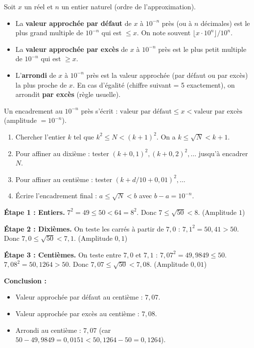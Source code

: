 \documentclass[11pt]{article}
\begin{document}
\begin{definition}
Soit $x$ un réel et $n$ un entier naturel (ordre de l'approximation).
\begin{itemize}
    \item La \textbf{valeur approchée par défaut} de $x$ à $10^{-n}$ près (ou à $n$ décimales) est le plus grand multiple de $10^{-n}$ qui est $\le x$. On note souvent $\lfloor x \cdot 10^n \rfloor / 10^n$.
    \item La \textbf{valeur approchée par excès} de $x$ à $10^{-n}$ près est le plus petit multiple de $10^{-n}$ qui est $\ge x$.
    \item L'\textbf{arrondi} de $x$ à $10^{-n}$ près est la valeur approchée (par défaut ou par excès) la plus proche de $x$. En cas d'égalité (chiffre suivant = 5 exactement), on arrondit \textbf{par excès} (règle usuelle).
\end{itemize}
Un encadrement au $10^{-n}$ près s'écrit : $\text{valeur par défaut} \le x < \text{valeur par excès}$ (amplitude $= 10^{-n}$).
\end{definition}

\begin{methode}
\begin{enumerate}
    \item Chercher l'entier $k$ tel que $k^2 \le N < (k+1)^2$. On a $k \le \sqrt{N} < k+1$.
    \item Pour affiner au dixième : tester $(k + 0,1)^2, (k+0,2)^2, \dots$ jusqu'à encadrer $N$.
    \item Pour affiner au centième : tester $(k + d/10 + 0,01)^2, \dots$
    \item Écrire l'encadrement final : $a \le \sqrt{N} < b$ avec $b-a = 10^{-n}$.
\end{enumerate}
\end{methode}

\begin{exoresolu}
\textbf{Étape 1 : Entiers.}
$7^2 = 49 \le 50 < 64 = 8^2$. Donc $7 \le \sqrt{50} < 8$. (Amplitude $1$)

\textbf{Étape 2 : Dixièmes.}
On teste les carrés à partir de $7,0$ :
$7,1^2 = 50,41 > 50$.
Donc $7,0 \le \sqrt{50} < 7,1$. (Amplitude $0,1$)

\textbf{Étape 3 : Centièmes.}
On teste entre $7,0$ et $7,1$ :
$7,07^2 = 49,9849 \le 50$.
$7,08^2 = 50,1264 > 50$.
Donc $\boxed{7,07 \le \sqrt{50} < 7,08}$. (Amplitude $0,01$)

\textbf{Conclusion :}
\begin{itemize}
    \item Valeur approchée par défaut au centième : $7,07$.
    \item Valeur approchée par excès au centième : $7,08$.
    \item Arrondi au centième : $7,07$ (car $50 - 49,9849 = 0,0151 < 50,1264 - 50 = 0,1264$).
\end{itemize}
\end{exoresolu}
\end{document}
